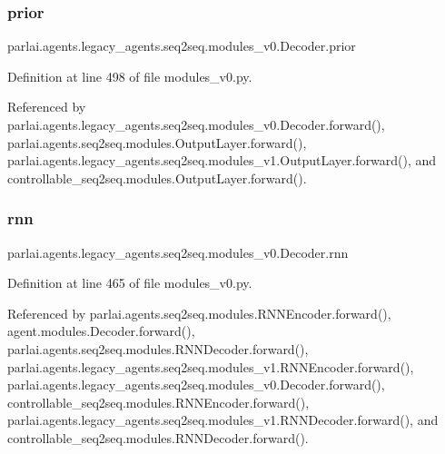 \subsubsection{\texorpdfstring{prior}{prior}}
{\footnotesize\ttfamily parlai.\+agents.\+legacy\+\_\+agents.\+seq2seq.\+modules\+\_\+v0.\+Decoder.\+prior}



Definition at line 498 of file modules\+\_\+v0.\+py.



Referenced by parlai.\+agents.\+legacy\+\_\+agents.\+seq2seq.\+modules\+\_\+v0.\+Decoder.\+forward(), parlai.\+agents.\+seq2seq.\+modules.\+Output\+Layer.\+forward(), parlai.\+agents.\+legacy\+\_\+agents.\+seq2seq.\+modules\+\_\+v1.\+Output\+Layer.\+forward(), and controllable\+\_\+seq2seq.\+modules.\+Output\+Layer.\+forward().

\mbox{\label{classparlai_1_1agents_1_1legacy__agents_1_1seq2seq_1_1modules__v0_1_1Decoder_a32b8681961b03f8acfdcc8093a813906}} 
\subsubsection{\texorpdfstring{rnn}{rnn}}
{\footnotesize\ttfamily parlai.\+agents.\+legacy\+\_\+agents.\+seq2seq.\+modules\+\_\+v0.\+Decoder.\+rnn}



Definition at line 465 of file modules\+\_\+v0.\+py.



Referenced by parlai.\+agents.\+seq2seq.\+modules.\+R\+N\+N\+Encoder.\+forward(), agent.\+modules.\+Decoder.\+forward(), parlai.\+agents.\+seq2seq.\+modules.\+R\+N\+N\+Decoder.\+forward(), parlai.\+agents.\+legacy\+\_\+agents.\+seq2seq.\+modules\+\_\+v1.\+R\+N\+N\+Encoder.\+forward(), parlai.\+agents.\+legacy\+\_\+agents.\+seq2seq.\+modules\+\_\+v0.\+Decoder.\+forward(), controllable\+\_\+seq2seq.\+modules.\+R\+N\+N\+Encoder.\+forward(), parlai.\+agents.\+legacy\+\_\+agents.\+seq2seq.\+modules\+\_\+v1.\+R\+N\+N\+Decoder.\+forward(), and controllable\+\_\+seq2seq.\+modules.\+R\+N\+N\+Decoder.\+forward().

